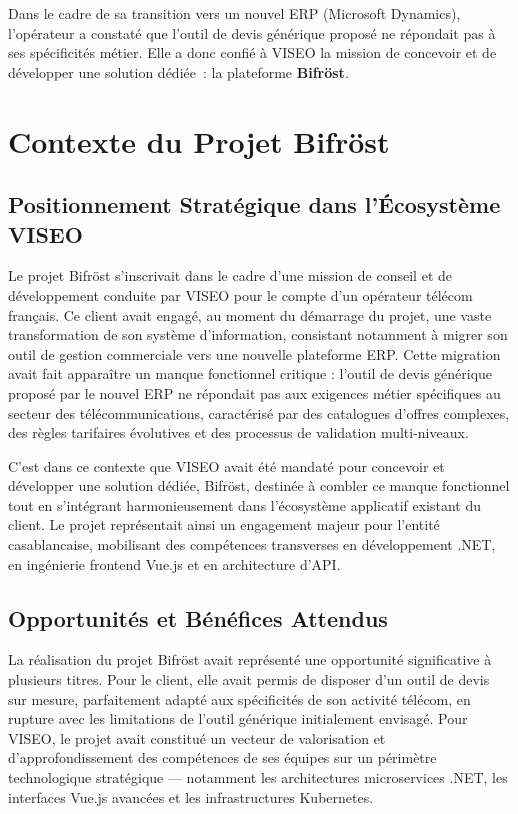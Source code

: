 Dans le cadre de sa transition vers un nouvel ERP (Microsoft Dynamics), l'opérateur a constaté que l'outil de devis générique proposé ne répondait pas à ses spécificités métier. Elle a donc confi\'e \`a VISEO la mission de concevoir et de d\'evelopper une solution d\'edi\'ee~: la plateforme \textbf{Bifr\"ost}.

\section{Contexte du Projet Bifröst}
\label{sec:contexte_Bifröst_ch1}
 
\subsection{Positionnement Stratégique dans l'Écosystème VISEO}
 
Le projet Bifröst s'inscrivait dans le cadre d'une mission de conseil et de développement conduite par VISEO pour le compte d'un opérateur télécom français. Ce client avait engagé, au moment du démarrage du projet, une vaste transformation de son système d'information, consistant notamment à migrer son outil de gestion commerciale vers une nouvelle plateforme ERP. Cette migration avait fait apparaître un manque fonctionnel critique : l'outil de devis générique proposé par le nouvel ERP ne répondait pas aux exigences métier spécifiques au secteur des télécommunications, caractérisé par des catalogues d'offres complexes, des règles tarifaires évolutives et des processus de validation multi-niveaux.
 
C'est dans ce contexte que VISEO avait été mandaté pour concevoir et développer une solution dédiée, Bifröst, destinée à combler ce manque fonctionnel tout en s'intégrant harmonieusement dans l'écosystème applicatif existant du client. Le projet représentait ainsi un engagement majeur pour l'entité casablancaise, mobilisant des compétences transverses en développement .NET, en ingénierie frontend Vue.js et en architecture d'API.
 
\subsection{Opportunités et Bénéfices Attendus}
 
La réalisation du projet Bifröst avait représenté une opportunité significative à plusieurs titres. Pour le client, elle avait permis de disposer d'un outil de devis sur mesure, parfaitement adapté aux spécificités de son activité télécom, en rupture avec les limitations de l'outil générique initialement envisagé. Pour VISEO, le projet avait constitué un vecteur de valorisation et d'approfondissement des compétences de ses équipes sur un périmètre technologique stratégique — notamment les architectures microservices .NET, les interfaces Vue.js avancées et les infrastructures Kubernetes.
 
